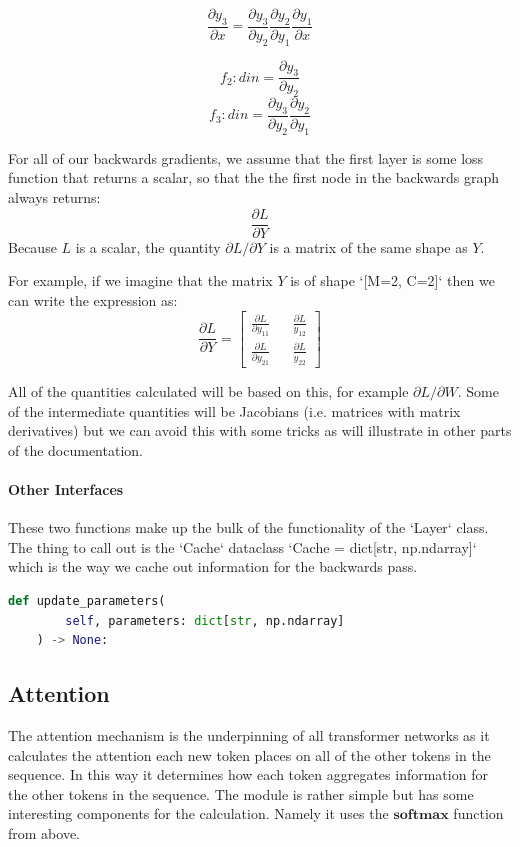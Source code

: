 \documentclass{article}
\begin{document}
$$
\frac{\partial y_3}{\partial x} =
\frac{\partial y_3}{\partial y_2}
\frac{\partial y_2}{\partial y_1}
\frac{\partial y_1}{\partial x}
$$

$$
f_2: din = \frac{\partial y_3}{\partial y_2}
$$
$$
f_3: din = \frac{\partial y_3}{\partial y_2}
\frac{\partial y_2}{\partial y_1}
$$

For all of our backwards gradients, we assume that the first layer is some loss function that returns a scalar, so that the the first node in the backwards graph always returns:
$$
\frac{\partial L}{\partial Y}
$$
Because $L$ is a scalar, the quantity $\partial L / \partial Y$ is a matrix of the same shape as $Y$.

For example, if we imagine that the matrix $Y$ is of shape `[M=2, C=2]` then we can write the expression as:
$$
\frac{\partial L}{\partial Y} = \begin{bmatrix}
 \frac{\partial L}{\partial y_{11}} && \frac{\partial L}{y_{12}} \\
 \frac{\partial L}{\partial y_{21}} && \frac{\partial L}{y_{22}}
\end{bmatrix}
$$ 

All of the quantities calculated will be based on this, for example $\partial L / \partial W$. Some of the intermediate quantities will be Jacobians (i.e. matrices with matrix derivatives) but we can avoid this with some tricks as will illustrate in other parts of the documentation.

\paragraph*{Other Interfaces}

These two functions make up the bulk of the functionality of the `Layer` class. The thing to call out is the `Cache` dataclass `Cache = dict[str, np.ndarray]` which is the way we cache out information for the backwards pass.

\begin{lstlisting}[language=Python]
    def update_parameters(
        self, parameters: dict[str, np.ndarray]
    ) -> None:
\end{lstlisting}

\subsection*{Attention}

The attention mechanism is the underpinning of all transformer networks as 
it calculates the attention each new token places on all of the other tokens
in the sequence. In this way it determines how each token aggregates 
information for the other tokens in the sequence. The module is rather
simple but has some interesting components for the calculation. Namely it uses
the $\textbf{softmax}$ function from above.
\end{document}
